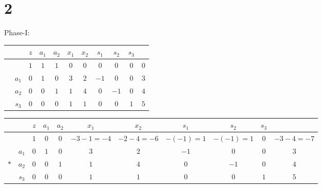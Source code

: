 \documentclass[a4paper,12pt]{article}
\begin{document}
\section*{2}
Phase-I:
\begin{table}[H]
    \tiny
    \begin{tabularx}{\textwidth}{cc|cccccccc|c}
         &       & $z$ & $a_1$ & $a_2$ & $x_1$ & $x_2$ & $s_1$ & $s_2$ & $s_3$ &     \\
        \hline
         &       & $1$ & $1$   & $1$   & $0$   & $0$   & $0$   & $0$   & $0$   & $0$ \\
        \hline
         & $a_1$ & $0$ & $1$   & $0$   & $3$   & $2$   & $-1$  & $0$   & $0$   & $3$ \\
         & $a_2$ & $0$ & $0$   & $1$   & $1$   & $4$   & $0$   & $-1$  & $0$   & $4$ \\
         & $s_3$ & $0$ & $0$   & $0$   & $1$   & $1$   & $0$   & $0$   & $1$   & $5$ \\
    \end{tabularx}
\end{table}

\begin{table}[H]
    \tiny
    \begin{tabularx}{\textwidth}{cc|cccccccc|c}
            &       & $z$ & $a_1$ & $a_2$ & $x_1$          & $x_2$          & $s_1$        & $s_2$        & $s_3$ &                \\
        \hline
            &       & $1$ & $0$   & $0$   & $- 3 - 1 = -4$ & $- 2 - 4 = -6$ & $- (-1) = 1$ & $- (-1) = 1$ & $0$   & $- 3 - 4 = -7$ \\
        \hline
            & $a_1$ & $0$ & $1$   & $0$   & $3$            & $2$            & $-1$         & $0$          & $0$   & $3$            \\
        $*$ & $a_2$ & $0$ & $0$   & $1$   & $1$            & $4$            & $0$          & $-1$         & $0$   & $4$            \\
            & $s_3$ & $0$ & $0$   & $0$   & $1$            & $1$            & $0$          & $0$          & $1$   & $5$            \\
    \end{tabularx}
\end{table}
\end{document}

